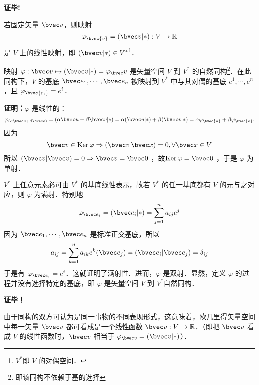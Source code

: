 \textbf{证毕!}

若固定矢量 $\bvec v$，则映射
\begin{equation}
\varphi_\bvec{v}=(\bvec v|*):V\rightarrow\mathbb{R}
\end{equation}
是 $V$ 上的线性映射，即 $(\bvec v|*)\in V^*$\footnote{$V^*$即 $V$ 的对偶空间．}．
\begin{theorem}{}
映射 $\varphi:\bvec v\mapsto (\bvec v|*)=\varphi_\bvec v$ 是矢量空间 $V$ 到 $V^*$ 的自然同构\footnote{即该同构不依赖于基的选择}．在此同构下，$V$ 的基底 $\bvec e_1,\cdots,\bvec e_n$ 被映射到 $V^*$ 中与其对偶的基底 $e^1,\cdots,e^n$，且 $\varphi_\bvec{e_i}=e^i$．
\end{theorem}
\textbf{证明：}$\varphi$ 是线性的：
\begin{equation}
\varphi_{(\alpha\bvec u+\beta\bvec v)}=(\alpha\bvec u+\beta\bvec v|*)=\alpha(\bvec u|*)+\beta(\bvec v|*)=\alpha\varphi_\bvec{u}+\beta\varphi_\bvec{v}.
\end{equation}
因为 
\begin{equation}
\bvec v\in \mathrm{Ker}\,\varphi\Rightarrow(\bvec v|\bvec x)=0,\forall\bvec x\in V
\end{equation}
所以 $(\bvec v|\bvec v)=0\Rightarrow\bvec v=\bvec 0$ ，故$\mathrm{Ker}\,\varphi=\bvec 0$ ，于是 $\varphi$ 为单射．

$V^*$ 上任意元素必可由 $V^*$ 的基底线性表示，故若 $V^*$ 的任一基底都有 $V$ 的元与之对应，则 $\varphi$ 为满射．特别地
\begin{equation}
\varphi_{\bvec e_i}=(\bvec e_i|*)=\sum_{j=1}^{n} a_{ij}e^j
\end{equation}
因为  $\bvec e_1,\cdots,\bvec e_n$ 是标准正交基底，所以
\begin{equation}
a_{ij}=\sum_{k=1}^n a_{ik}e^k(\bvec e_j)=(\bvec e_i|\bvec e_j)=\delta_{ij}
\end{equation}
于是有 $\varphi_{\bvec e_i}=e^i$．这就证明了满射性．进而，$\varphi$ 是双射．显然，定义 $\varphi$ 的过程并没有选择特定的基底，即 $\varphi$ 是矢量空间 $V$ 到 $V^*$自然同构．

\textbf{证毕！}

由于同构的双方可认为是同一事物的不同表现形式，这意味着，欧几里得矢量空间中每一矢量 $\bvec v$ 都可看成是一个线性函数 $\bvec v:V\rightarrow\mathbb{R}$．（即把 $\bvec v$ 看成 $V$ 的线性函数时，$\bvec v$ 相当于 $\varphi_{\bvec v}=(\bvec v|*)$）．
